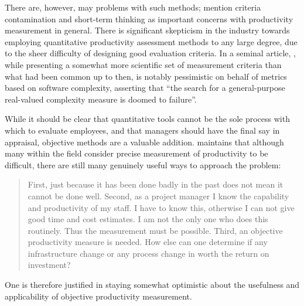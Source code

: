 \documentclass[letterpaper, 12pt]{report}
\begin{document}
There are, however, may problems with such methods; \textcite[][374]{textbook} mention criteria contamination and short-term thinking as important concerns with productivity measurement in general. 
There is significant skepticism in the industry towards employing quantitative productivity assessment methods to any large degree, due to the sheer difficulty of designing good evaluation criteria. 
In a seminal article, \textcite{fenton:scientificbasis}, while presenting a somewhat more scientific set of measurement criteria than what had been common up to then, is notably pessimistic on behalf of metrics based on software complexity, asserting that ``the search for a general-purpose real-valued complexity measure is doomed to failure''. 

While it should be clear that quantitative tools cannot be the sole process with which to evaluate employees, and that managers should have the final say in appraisal, objective methods are a valuable addition.
\textcite{angel:howto} maintains that although many within the field consider precise measurement of productivity to be difficult, there are still many genuinely useful ways to approach the problem:

\begin{quote}
	First, just because it has been done badly in the past does not mean it cannot be done well. 
	Second, as a project manager I know the capability and productivity of my staff. 
	I have to know this, otherwise I can not give good time and cost estimates. 
	I am not the only one who does this routinely. 
	Thus the measurement must be possible. 
	Third, an objective productivity measure is needed. 
	How else can one determine if any infrastructure change or any process change in worth the return on investment?
\end{quote}
One is therefore justified in staying somewhat optimistic about the usefulness and applicability of objective productivity measurement.
\end{document}
